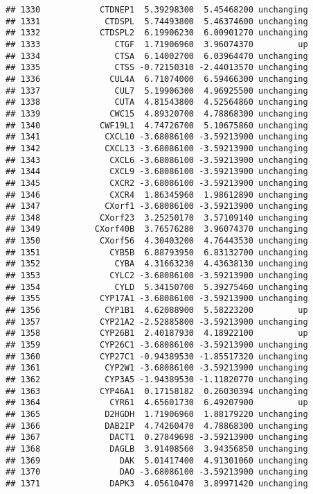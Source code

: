 \documentclass[]{article}
\begin{document}
\begin{verbatim}
## 1330            CTDNEP1  5.39298300  5.45468200 unchanging
## 1331             CTDSPL  5.74493800  5.46374600 unchanging
## 1332            CTDSPL2  6.19906230  6.00901270 unchanging
## 1333               CTGF  1.71906960  3.96074370         up
## 1334               CTSA  6.14002700  6.03964470 unchanging
## 1335               CTSS -0.72150310 -2.44013570 unchanging
## 1336              CUL4A  6.71074000  6.59466300 unchanging
## 1337               CUL7  5.19906300  4.96925500 unchanging
## 1338               CUTA  4.81543800  4.52564860 unchanging
## 1339              CWC15  4.89320700  4.78868300 unchanging
## 1340            CWF19L1  4.74726700  5.10675860 unchanging
## 1341             CXCL10 -3.68086100 -3.59213900 unchanging
## 1342             CXCL13 -3.68086100 -3.59213900 unchanging
## 1343              CXCL6 -3.68086100 -3.59213900 unchanging
## 1344              CXCL9 -3.68086100 -3.59213900 unchanging
## 1345              CXCR2 -3.68086100 -3.59213900 unchanging
## 1346              CXCR4  1.86345960  1.98612890 unchanging
## 1347             CXorf1 -3.68086100 -3.59213900 unchanging
## 1348            CXorf23  3.25250170  3.57109140 unchanging
## 1349           CXorf40B  3.76576280  3.96074370 unchanging
## 1350            CXorf56  4.30403200  4.76443530 unchanging
## 1351              CYB5B  6.88793950  6.83132700 unchanging
## 1352               CYBA  4.31663230  4.43638130 unchanging
## 1353              CYLC2 -3.68086100 -3.59213900 unchanging
## 1354               CYLD  5.34150700  5.39275460 unchanging
## 1355            CYP17A1 -3.68086100 -3.59213900 unchanging
## 1356             CYP1B1  4.62088900  5.58223200         up
## 1357            CYP21A2 -2.52885800 -3.59213900 unchanging
## 1358            CYP26B1  2.40187930  4.18922100         up
## 1359            CYP26C1 -3.68086100 -3.59213900 unchanging
## 1360            CYP27C1 -0.94389530 -1.85517320 unchanging
## 1361             CYP2W1 -3.68086100 -3.59213900 unchanging
## 1362             CYP3A5 -1.94389530 -1.11820770 unchanging
## 1363            CYP46A1  0.17158182  0.26030394 unchanging
## 1364              CYR61  4.65601730  6.49207900         up
## 1365             D2HGDH  1.71906960  1.88179220 unchanging
## 1366             DAB2IP  4.74260470  4.78868300 unchanging
## 1367              DACT1  0.27849698 -3.59213900 unchanging
## 1368              DAGLB  3.91408560  3.94356850 unchanging
## 1369                DAK  5.01417400  4.91301060 unchanging
## 1370                DAO -3.68086100 -3.59213900 unchanging
## 1371              DAPK3  4.05610470  3.89971420 unchanging

\end{verbatim}
\end{document}
